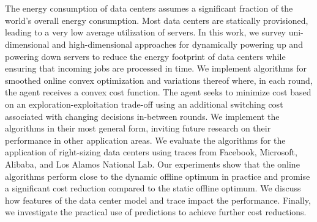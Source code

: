 \chapter{\abstractname}

The energy consumption of data centers assumes a significant fraction of the world's overall energy consumption. Most data centers are statically provisioned, leading to a very low average utilization of servers. In this work, we survey uni-dimensional and high-dimensional approaches for dynamically powering up and powering down servers to reduce the energy footprint of data centers while ensuring that incoming jobs are processed in time. We implement algorithms for smoothed online convex optimization and variations thereof where, in each round, the agent receives a convex cost function. The agent seeks to minimize cost based on an exploration-exploitation trade-off using an additional switching cost associated with changing decisions in-between rounds. We implement the algorithms in their most general form, inviting future research on their performance in other application areas. We evaluate the algorithms for the application of right-sizing data centers using traces from Facebook, Microsoft, Alibaba, and Los Alamos National Lab. Our experiments show that the online algorithms perform close to the dynamic offline optimum in practice and promise a significant cost reduction compared to the static offline optimum. We discuss how features of the data center model and trace impact the performance. Finally, we investigate the practical use of predictions to achieve further cost reductions.